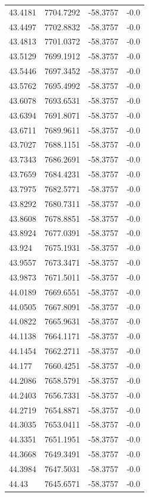 \begin{table}[H]
\begin{tabular}{llll}
43.4181 & 7704.7292 & -58.3757 & -0.0 \\
43.4497 & 7702.8832 & -58.3757 & -0.0 \\
43.4813 & 7701.0372 & -58.3757 & -0.0 \\
43.5129 & 7699.1912 & -58.3757 & -0.0 \\
43.5446 & 7697.3452 & -58.3757 & -0.0 \\
43.5762 & 7695.4992 & -58.3757 & -0.0 \\
43.6078 & 7693.6531 & -58.3757 & -0.0 \\
43.6394 & 7691.8071 & -58.3757 & -0.0 \\
43.6711 & 7689.9611 & -58.3757 & -0.0 \\
43.7027 & 7688.1151 & -58.3757 & -0.0 \\
43.7343 & 7686.2691 & -58.3757 & -0.0 \\
43.7659 & 7684.4231 & -58.3757 & -0.0 \\
43.7975 & 7682.5771 & -58.3757 & -0.0 \\
43.8292 & 7680.7311 & -58.3757 & -0.0 \\
43.8608 & 7678.8851 & -58.3757 & -0.0 \\
43.8924 & 7677.0391 & -58.3757 & -0.0 \\
43.924 & 7675.1931 & -58.3757 & -0.0 \\
43.9557 & 7673.3471 & -58.3757 & -0.0 \\
43.9873 & 7671.5011 & -58.3757 & -0.0 \\
44.0189 & 7669.6551 & -58.3757 & -0.0 \\
44.0505 & 7667.8091 & -58.3757 & -0.0 \\
44.0822 & 7665.9631 & -58.3757 & -0.0 \\
44.1138 & 7664.1171 & -58.3757 & -0.0 \\
44.1454 & 7662.2711 & -58.3757 & -0.0 \\
44.177 & 7660.4251 & -58.3757 & -0.0 \\
44.2086 & 7658.5791 & -58.3757 & -0.0 \\
44.2403 & 7656.7331 & -58.3757 & -0.0 \\
44.2719 & 7654.8871 & -58.3757 & -0.0 \\
44.3035 & 7653.0411 & -58.3757 & -0.0 \\
44.3351 & 7651.1951 & -58.3757 & -0.0 \\
44.3668 & 7649.3491 & -58.3757 & -0.0 \\
44.3984 & 7647.5031 & -58.3757 & -0.0 \\
44.43 & 7645.6571 & -58.3757 & -0.0 \\

\end{tabular}
\end{table}
